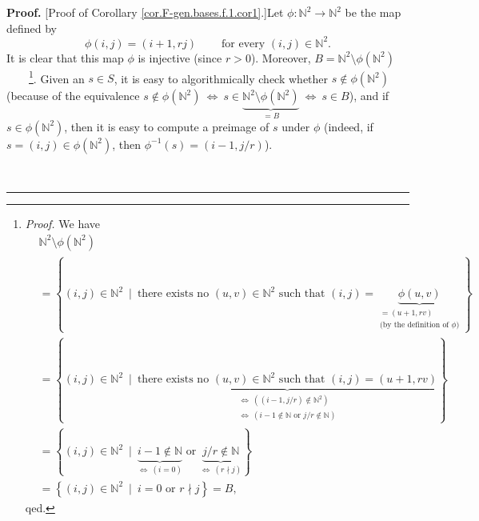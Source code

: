 \documentclass[numbers=enddot,12pt,final,onecolumn,notitlepage]{scrartcl}%
\theoremstyle{definition}
\newenvironment{proof}[1][Proof]{\noindent\textbf{#1.} }{\ \rule{0.5em}{0.5em}}
\begin{document}
\begin{proof}
[Proof of Corollary \ref{cor.F-gen.bases.f.1.cor1}.]Let $\phi:\mathbb{N}%
^{2}\rightarrow\mathbb{N}^{2}$ be the map defined by%
\[
\phi\left(  i,j\right)  =\left(  i+1,rj\right)  \ \ \ \ \ \ \ \ \ \ \text{for
every }\left(  i,j\right)  \in\mathbb{N}^{2}.
\]
It is clear that this map $\phi$ is injective (since $r>0$). Moreover,
$B=\mathbb{N}^{2}\setminus\phi\left(  \mathbb{N}^{2}\right)  $%
\ \ \ \ \footnote{\textit{Proof.} We have
\begin{align*}
&  \mathbb{N}^{2}\setminus\phi\left(  \mathbb{N}^{2}\right) \\
&  =\left\{  \left(  i,j\right)  \in\mathbb{N}^{2}\ \mid\ \text{there exists
no }\left(  u,v\right)  \in\mathbb{N}^{2}\text{ such that }\left(  i,j\right)
=\underbrace{\phi\left(  u,v\right)  }_{\substack{=\left(  u+1,rv\right)
\\\text{(by the definition of }\phi\text{)}}}\right\} \\
&  =\left\{  \left(  i,j\right)  \in\mathbb{N}^{2}\ \mid
\ \underbrace{\text{there exists no }\left(  u,v\right)  \in\mathbb{N}%
^{2}\text{ such that }\left(  i,j\right)  =\left(  u+1,rv\right)
}_{\substack{\Longleftrightarrow\ \left(  \left(  i-1,j/r\right)
\notin\mathbb{N}^{2}\right)  \\\Longleftrightarrow\ \left(  i-1\notin%
\mathbb{N}\text{ or }j/r\notin\mathbb{N}\right)  }}\right\} \\
&  =\left\{  \left(  i,j\right)  \in\mathbb{N}^{2}\ \mid
\ \underbrace{i-1\notin\mathbb{N}}_{\Longleftrightarrow\ \left(  i=0\right)
}\text{ or }\underbrace{j/r\notin\mathbb{N}}_{\Longleftrightarrow\ \left(
r\nmid j\right)  }\right\} \\
&  =\left\{  \left(  i,j\right)  \in\mathbb{N}^{2}\ \mid\ i=0\text{ or }r\nmid
j\right\}  =B,
\end{align*}
qed.}. Given an $s\in S$, it is easy to algorithmically check whether
$s\notin\phi\left(  \mathbb{N}^{2}\right)  $ (because of the equivalence
$s\notin\phi\left(  \mathbb{N}^{2}\right)  \ \Longleftrightarrow
\ s\in\underbrace{\mathbb{N}^{2}\setminus\phi\left(  \mathbb{N}^{2}\right)
}_{=B}\ \Longleftrightarrow\ s\in B$), and if $s\in\phi\left(  \mathbb{N}%
^{2}\right)  $, then it is easy to compute a preimage of $s$ under $\phi$
(indeed, if $s=\left(  i,j\right)  \in\phi\left(  \mathbb{N}^{2}\right)  $,
then $\phi^{-1}\left(  s\right)  =\left(  i-1,j/r\right)  $).


\end{proof}
\end{document}
